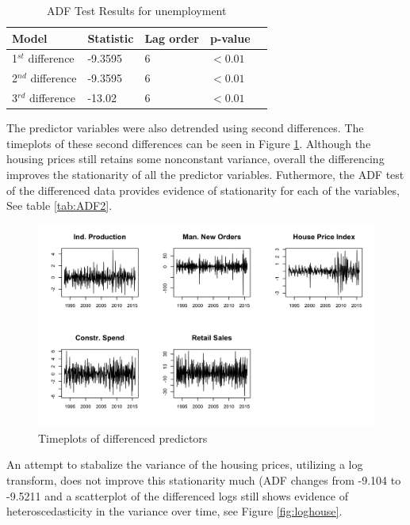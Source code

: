 \documentclass[twoside,twocolumn]{article}
\begin{document}
		 \begin{table}[htb]
		 \centering
		 \caption{ADF Test Results for unemployment}
		 \label{tab:ADF}
		 \begin{tabular}{lllll}
		 \hline
		 \textbf{Model} & \textbf{Statistic} & \textbf{Lag order} & \textbf{p-value}\\ \hline
		  1\(^{st}\) difference &  -9.3595 & 6 &\( < 0.01\)\\
		  2\(^{nd}\) difference &  -9.3595 & 6 & \( < 0.01\)\\			  
		  3\(^{rd}\) difference &  -13.02 & 6 & \( < 0.01\)\\		 \hline
		 \end{tabular}
		 \end{table}
The predictor variables were also detrended using second differences. The timeplots of these second differences can be seen in Figure \ref{fig:statpred}. Although the housing prices still retains some nonconstant variance, overall the differencing improves the stationarity of all the predictor variables.  Futhermore, the ADF test of the differenced data provides evidence of stationarity for each of the variables, See table \ref{tab:ADF2}. 

		\begin{figure}[htb]
		\centering
		\caption{Timeplots of differenced predictors}
		\label{fig:statpred}
		\includegraphics[width=\linewidth]{images/StationaryPred}
		\end{figure}

An attempt to stabalize the variance of the housing prices, utilizing a log transform, does not improve this stationarity much (ADF changes from -9.104 to -9.5211 and a scatterplot of the differenced logs still shows evidence of heteroscedasticity in the variance over time, see Figure \ref{fig:loghouse}. 
\end{document}
